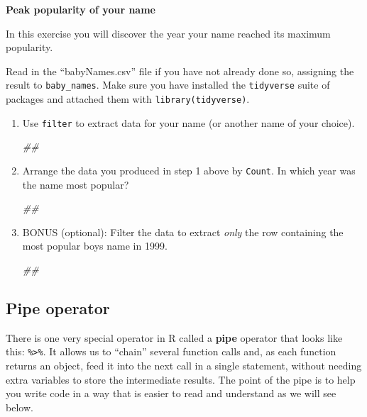 \documentclass[
]{book}
\newenvironment{Shaded}{\begin{snugshade}}{\end{snugshade}}
\newcommand{\CommentTok}[1]{\textcolor[rgb]{0.56,0.35,0.01}{\textit{#1}}}
\begin{document}
\textbf{Peak popularity of your name}

In this exercise you will discover the year your name reached its maximum popularity.

Read in the ``babyNames.csv'' file if you have not already done so,
assigning the result to \texttt{baby\_names}. Make sure you have installed
the \texttt{tidyverse} suite of packages and attached them with \texttt{library(tidyverse)}.

\begin{enumerate}
\def\labelenumi{\arabic{enumi}.}
\item
  Use \texttt{filter} to extract data for your name (or another name of your choice).

\begin{Shaded}
\begin{Highlighting}[]
\CommentTok{##}
\end{Highlighting}
\end{Shaded}
\item
  Arrange the data you produced in step 1 above by \texttt{Count}.
  In which year was the name most popular?

\begin{Shaded}
\begin{Highlighting}[]
\CommentTok{##}
\end{Highlighting}
\end{Shaded}
\item
  BONUS (optional): Filter the data to extract \emph{only} the
  row containing the most popular boys name in 1999.

\begin{Shaded}
\begin{Highlighting}[]
\CommentTok{##}
\end{Highlighting}
\end{Shaded}
\end{enumerate}

\hypertarget{pipe-operator}{%
\subsection{Pipe operator}\label{pipe-operator}}

There is one very special operator in R called a \textbf{pipe} operator that
looks like this: \texttt{\%\textgreater{}\%}. It allows us to ``chain'' several function calls and,
as each function returns an object, feed it into the next call in a single
statement, without needing extra variables to store the intermediate
results. The point of the pipe is to help you write code in a way that is
easier to read and understand as we will see below.
\end{document}
